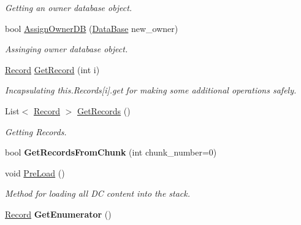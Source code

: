 \begin{DoxyCompactItemize}
\begin{DoxyCompactList}\small\item\em Getting an owner database object. \item\end{DoxyCompactList}\item 
bool \hyperlink{class_dwarf_d_b_1_1_data_structures_1_1_data_container_aeac4bb0b67fdcba42ea4933a03f295c3}{AssignOwnerDB} (\hyperlink{class_dwarf_d_b_1_1_data_structures_1_1_data_base}{DataBase} new\_\-owner)
\begin{DoxyCompactList}\small\item\em Assinging owner database object. \item\end{DoxyCompactList}\item 
\hyperlink{class_dwarf_d_b_1_1_data_structures_1_1_record}{Record} \hyperlink{class_dwarf_d_b_1_1_data_structures_1_1_data_container_afdcd349b09fa679ea11d0a04e073e965}{GetRecord} (int i)
\begin{DoxyCompactList}\small\item\em Incapsulating this.Records\mbox{[}i\mbox{]}.get for making some additional operations safely. \item\end{DoxyCompactList}\item 
List$<$ \hyperlink{class_dwarf_d_b_1_1_data_structures_1_1_record}{Record} $>$ \hyperlink{class_dwarf_d_b_1_1_data_structures_1_1_data_container_ab9691aa5445b0069bb30c4d7a9f6139c}{GetRecords} ()
\begin{DoxyCompactList}\small\item\em Getting Records. \item\end{DoxyCompactList}\item 
\hypertarget{class_dwarf_d_b_1_1_data_structures_1_1_data_container_ad72368f523f462dd3baee29e6ba4da66}{
bool {\bfseries GetRecordsFromChunk} (int chunk\_\-number=0)}
\label{class_dwarf_d_b_1_1_data_structures_1_1_data_container_ad72368f523f462dd3baee29e6ba4da66}

\item 
void \hyperlink{class_dwarf_d_b_1_1_data_structures_1_1_data_container_adb2c609dd0c1c9230ac94454a6db723f}{PreLoad} ()
\begin{DoxyCompactList}\small\item\em Method for loading all DC content into the stack. \item\end{DoxyCompactList}\item 
\hypertarget{class_dwarf_d_b_1_1_data_structures_1_1_data_container_aaea9c8cb3180484e56d0f6b47f90b23c}{
\hyperlink{class_dwarf_d_b_1_1_data_structures_1_1_record}{Record} {\bfseries GetEnumerator} ()}
\label{class_dwarf_d_b_1_1_data_structures_1_1_data_container_aaea9c8cb3180484e56d0f6b47f90b23c}


\end{DoxyCompactItemize}
